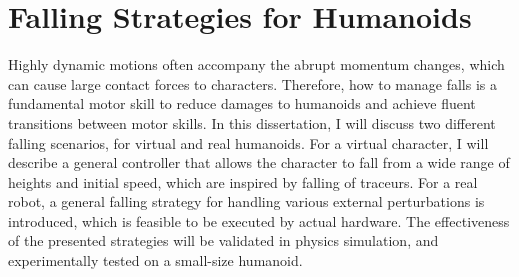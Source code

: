 \section{Falling Strategies for Humanoids}
Highly dynamic motions often accompany the abrupt momentum changes, which can
cause large contact forces to characters.
Therefore, how to manage falls is a fundamental motor skill to reduce damages
to humanoids and achieve fluent transitions between motor skills.
In this dissertation, I will discuss two different falling scenarios, 
for  virtual and real humanoids.
For a virtual character, I will describe a general controller that allows the character to fall from a wide range of heights and initial speed,
which are inspired by falling of traceurs.
For a real robot, a general falling strategy for handling various 
external perturbations is introduced, which is feasible to be
executed by actual hardware.
The effectiveness of the presented strategies will be validated in physics
simulation, and experimentally tested on a small-size humanoid.

